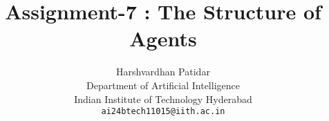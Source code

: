 \documentclass{article}
\title{Assignment-7 : The Structure of Agents}
\author{Harshvardhan Patidar\\
  Department of Artificial Intelligence\\
  Indian Institute of Technology Hyderabad\\
  \texttt{ai24btech11015@iith.ac.in}
}
\begin{document}
\



\maketitle






















\end{document}

